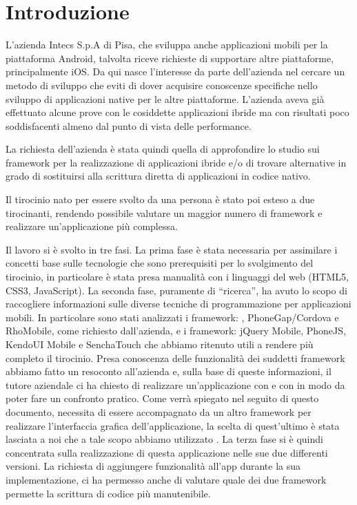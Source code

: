 \setcounter{page}{1}

\chapter{Introduzione}
    L'azienda Intecs S.p.A di Pisa, che sviluppa anche applicazioni mobili per la
    piattaforma Android, talvolta riceve richieste di supportare altre piattaforme,
    principalmente iOS. Da qui nasce l'interesse da parte dell'azienda nel
    cercare un metodo di sviluppo \crossplat{} che eviti di dover acquisire
    conoscenze specifiche nello sviluppo di applicazioni native per le altre
    piattaforme. L'azienda aveva già effettuato alcune prove con le cosiddette
    applicazioni ibride ma con risultati poco soddisfacenti almeno dal punto di
    vista delle performance.

    La richiesta dell'azienda è stata quindi quella di approfondire lo studio sui
    framework per la realizzazione di applicazioni ibride e/o di trovare alternative
    in grado di sostituirsi alla scrittura diretta di applicazioni in codice
    nativo.

    Il tirocinio nato per essere svolto da una persona è stato poi esteso a due
    tirocinanti, rendendo possibile valutare un maggior numero di framework e
    realizzare un'applicazione più complessa.

    Il lavoro si è svolto in tre fasi. La prima fase è stata necessaria per
    assimilare i concetti base sulle tecnologie che sono prerequisiti per lo
    svolgimento del tirocinio, in particolare è stata presa manualità con i
    linguaggi del web (HTML5, CSS3, JavaScript). La seconda fase, puramente di
    ``ricerca'', ha avuto lo scopo di raccogliere informazioni sulle diverse
    tecniche di programmazione per applicazioni mobili. In particolare sono
    stati analizzati i framework: \tisdk{},
    PhoneGap/Cordova e RhoMobile, come richiesto dall'azienda, e i framework:
    jQuery Mobile, PhoneJS, KendoUI Mobile e SenchaTouch che abbiamo ritenuto
    utili a rendere più completo il tirocinio.
    Presa conoscenza delle funzionalità dei suddetti framework abbiamo fatto un
    resoconto all'azienda e, sulla base di queste informazioni, il tutore
    aziendale ci ha chiesto di realizzare un'applicazione con \pg{} e con
    \tisdk{} in modo da poter fare un confronto pratico. Come verrà spiegato
    nel seguito di questo documento, \pg{} necessita di essere accompagnato da
    un altro framework per realizzare l'interfaccia grafica
    dell'applicazione, la scelta di quest'ultimo è stata lasciata a noi che
    a tale scopo abbiamo utilizzato \kendomob{}.
    La terza fase si è quindi concentrata sulla realizzazione di questa
    applicazione nelle sue due differenti versioni. La richiesta di aggiungere
    funzionalità all'app durante la sua implementazione, ci ha permesso anche di
    valutare quale dei due framework permette la scrittura di codice più
    manutenibile.

